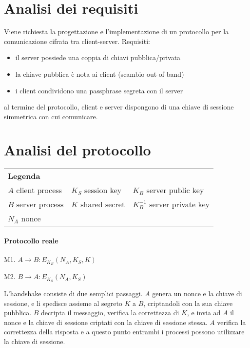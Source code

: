 \documentclass[a4paper]{article}
\title{\Title}
\author{\Author}
\date{\today}
\begin{document}
\maketitle

\section{Analisi dei requisiti}
Viene richiesta la progettazione e l'implementazione di un protocollo per la comunicazione cifrata tra client-server. Requisiti:
\begin{itemize}
\item il server possiede una coppia di chiavi pubblica/privata
\item la chiave pubblica è nota ai client (scambio out-of-band)
\item i client condividono una passphrase segreta con il server
\end{itemize}
al termine del protocollo, client e server dispongono di una chiave di sessione simmetrica con cui comunicare.


\section{Analisi del protocollo}

\begin{tabular}{ p{4cm} p{4cm} p{4cm} }
  {\bf Legenda}\\
  $A$     client process &
  $K_S$   session key &
  $K_{B}$ server public key \\

  $B$ server process &
  $K$ shared secret &
  $K_{B}^{-1}$ server private key \\

  $N_A$ nonce 
\end{tabular}


\paragraph{Protocollo reale}
\begin{list}{}{}
\item M1. $ A \rightarrow B: E_{K_{B}}(N_A, K_S, K) $
\item M2. $ B \rightarrow A: E_{K_S}(N_A, K_S) $
\end{list}
L'handshake consiste di due semplici passaggi. $A$ genera un nonce e la chiave di sessione, e li spedisce assieme al segreto $K$ a $B$, criptandoli con la sua chiave pubblica. $B$ decripta il messaggio, verifica la correttezza di $K$, e invia ad $A$ il nonce e la chiave di sessione criptati con la chiave di sessione stessa. $A$ verifica la correttezza della risposta e a questo punto entrambi i processi possono utilizzare la chiave di sessione.
\end{document}
